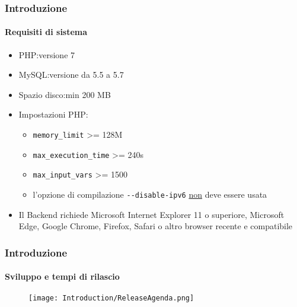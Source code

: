 \begin{frame}[fragile]
	\frametitle{Introduzione}
	\framesubtitle{Requisiti di sistema}

	\begin{itemize}
		\item PHP:\tabto{2.2cm}versione 7
		\item MySQL:\tabto{2.2cm}versione da 5.5 a 5.7
		\item Spazio disco:\tabto{2.2cm}min 200 MB
		\item Impostazioni PHP:

			\begin{itemize}
				\item \texttt{memory\_limit} >= 128M
				\item \texttt{max\_execution\_time} >= 240s
				\item \texttt{max\_input\_vars} >= 1500
				\item l'opzione di compilazione \texttt{-}\texttt{-disable-ipv6} \underline{non} deve essere usata
			\end{itemize}

		\item Il Backend richiede Microsoft Internet Explorer 11 o superiore,
			Microsoft Edge, Google Chrome, Firefox, Safari o altro browser recente
			e compatibile

	\end{itemize}

\end{frame}

\begin{frame}[fragile]
	\frametitle{Introduzione}
	\framesubtitle{Sviluppo e tempi di rilascio}

	\begin{figure}
		\texttt{[image: Introduction/ReleaseAgenda.png]}
	\end{figure}

\end{frame}

